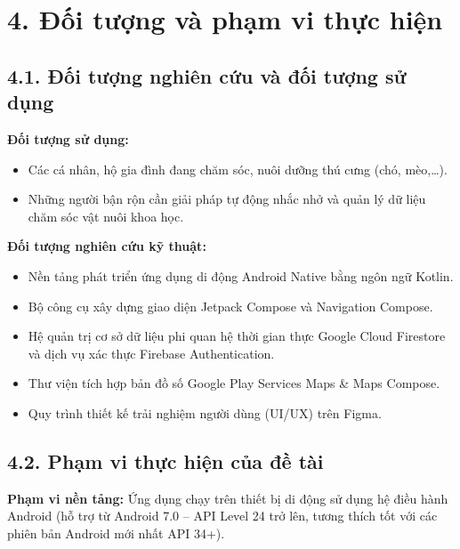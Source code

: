 \section*{4. Đối tượng và phạm vi thực hiện}

\subsection*{4.1. Đối tượng nghiên cứu và đối tượng sử dụng}

\textbf{Đối tượng sử dụng:}
\begin{itemize}
    \item Các cá nhân, hộ gia đình đang chăm sóc, nuôi dưỡng thú cưng (chó, mèo,\dots).
    \item Những người bận rộn cần giải pháp tự động nhắc nhở và quản lý dữ liệu chăm sóc vật nuôi khoa học.
\end{itemize}

\textbf{Đối tượng nghiên cứu kỹ thuật:}
\begin{itemize}
    \item Nền tảng phát triển ứng dụng di động Android Native bằng ngôn ngữ Kotlin.
    \item Bộ công cụ xây dựng giao diện Jetpack Compose và Navigation Compose.
    \item Hệ quản trị cơ sở dữ liệu phi quan hệ thời gian thực Google Cloud Firestore và dịch vụ xác thực Firebase Authentication.
    \item Thư viện tích hợp bản đồ số Google Play Services Maps \& Maps Compose.
    \item Quy trình thiết kế trải nghiệm người dùng (UI/UX) trên Figma.
\end{itemize}

\subsection*{4.2. Phạm vi thực hiện của đề tài}

\textbf{Phạm vi nền tảng:}
Ứng dụng chạy trên thiết bị di động sử dụng hệ điều hành Android (hỗ trợ từ Android 7.0 -- API Level 24 trở lên, tương thích tốt với các phiên bản Android mới nhất API 34+).

